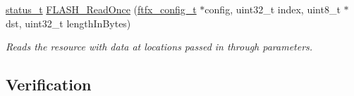 \begin{DoxyCompactItemize}
\item 
\mbox{\hyperlink{group__ksdk__common_gaaabdaf7ee58ca7269bd4bf24efcde092}{status\+\_\+t}} \mbox{\hyperlink{group__ftfx__flash__driver_gae5193ef1c2173048c1af7ebdd9bbff1c}{F\+L\+A\+S\+H\+\_\+\+Read\+Once}} (\mbox{\hyperlink{group__ftfx__controller_gab0196063c05bffb4cd2f249699a3378c}{ftfx\+\_\+config\+\_\+t}} $\ast$config, uint32\+\_\+t index, uint8\+\_\+t $\ast$dst, uint32\+\_\+t length\+In\+Bytes)
\begin{DoxyCompactList}\small\item\em Reads the resource with data at locations passed in through parameters. \end{DoxyCompactList}\end{DoxyCompactItemize}
\subsection*{Verification}
